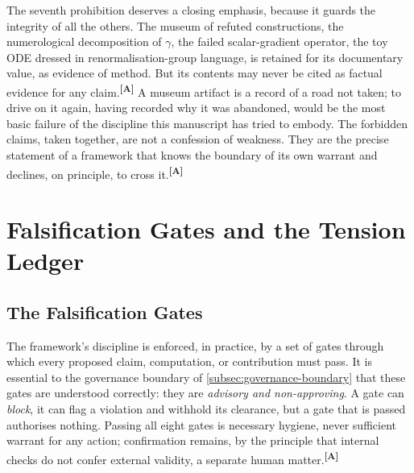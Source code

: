 \documentclass[12pt,a4paper,twoside]{article}
\theoremstyle{plain}
\theoremstyle{definition}
\theoremstyle{remark}
\newcommand{\catmark}[1]{\textsuperscript{\textsf{\textbf{[#1]}}}}
\begin{document}
\noindent The seventh prohibition deserves a closing emphasis, because it guards the integrity of all the others. The museum of refuted constructions, the numerological decomposition of $\gamma$, the failed scalar-gradient operator, the toy ODE dressed in renormalisation-group language, is retained for its documentary value, as evidence of method. But its contents may never be cited as factual evidence for any claim.\catmark{A} A museum artifact is a record of a road not taken; to drive on it again, having recorded why it was abandoned, would be the most basic failure of the discipline this manuscript has tried to embody. The forbidden claims, taken together, are not a confession of weakness. They are the precise statement of a framework that knows the boundary of its own warrant and declines, on principle, to cross it.\catmark{A}

\newpage
\section{Falsification Gates and the Tension Ledger}
\label{sec:falsification-tension}

\subsection{The Falsification Gates}
\label{subsec:falsification-gates}

The framework's discipline is enforced, in practice, by a set of gates through which every proposed claim, computation, or contribution must pass. It is essential to the governance boundary of \cref{subsec:governance-boundary} that these gates are understood correctly: they are \emph{advisory and non-approving}. A gate can \emph{block}, it can flag a violation and withhold its clearance, but a gate that is passed authorises nothing. Passing all eight gates is necessary hygiene, never sufficient warrant for any action; confirmation remains, by the principle that internal checks do not confer external validity, a separate human matter.\catmark{A}
\end{document}
